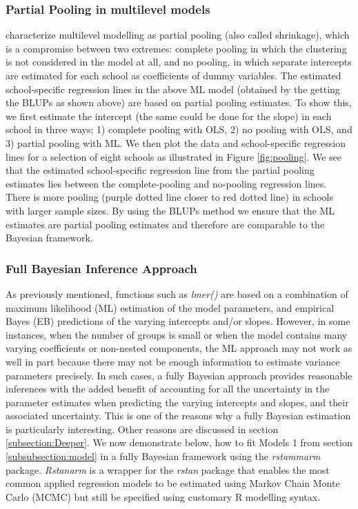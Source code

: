 \subsubsection*{Partial Pooling in multilevel models}
\cite{gelman2006data} characterize multilevel modelling as partial pooling (also called shrinkage), which is a compromise between two extremes: complete pooling in which the clustering is not considered in the model at all, and no pooling, in which separate intercepts are estimated for each school as coefficients of dummy variables. The estimated school-specific regression lines in the above ML model (obtained by the getting the BLUPs as shown above) are based on partial pooling estimates. To show this, we first estimate the intercept (the same could be done for the slope) in each school in three ways; 1) complete pooling with OLS, 2) no pooling with OLS, and 3) partial pooling with ML. We then plot the data and school-specific regression lines for a selection of eight schools as illustrated in Figure \ref{fig:pooling}. We see that the estimated school-specific regression line from the partial pooling estimates lies between the complete-pooling and no-pooling regression lines. There is more pooling (purple dotted line closer to red dotted line) in schools with larger sample sizes. By using the BLUPs method we ensure that the ML estimates are partial pooling estimates and therefore are comparable to the Bayesian framework.

\subsubsection{Full Bayesian Inference Approach}
As previously mentioned, functions such as \textit{lmer()} are based on a combination of maximum likelihood (ML) estimation of the model parameters, and empirical Bayes (EB) predictions of the varying intercepts and/or slopes. However, in some instances, when the number of groups is small or when the model contains many varying coefficients or non-nested components, the ML approach may not work as well in part because there may not be enough information to estimate variance parameters precisely. In such cases, a fully Bayesian approach provides reasonable inferences with the added benefit of accounting for all the uncertainty in the parameter estimates when predicting the varying intercepts and slopes, and their associated uncertainty. This is one of the reasons why a fully Bayesian estimation is particularly interesting. Other reasons are discussed in section \ref{subsection:Deeper}. We now demonstrate below, how to fit Models 1 from section \ref{subsubsection:model} in a fully Bayesian framework using the \textit{rstammarm} package. \textit{Rstanarm} is a wrapper for the \textit{rstan} package that enables the most common applied regression models to be estimated using Markov Chain Monte Carlo (MCMC) but still be specified using customary R modelling syntax.

